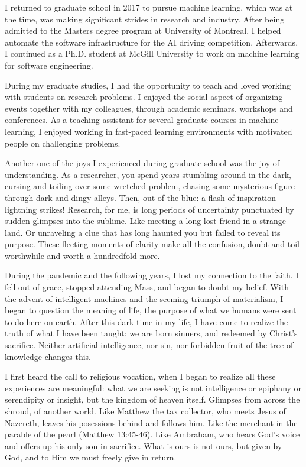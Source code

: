 \documentclass[11pt]{article}
\begin{document}
I returned to graduate school in 2017 to pursue machine learning, which was at the time, was making significant strides in research and industry. After being admitted to the Masters degree program at University of Montreal, I helped automate the software infrastructure for the AI driving competition. Afterwards, I continued as a Ph.D. student at McGill University to work on machine learning for software engineering.

During my graduate studies, I had the opportunity to teach and loved working with students on research problems. I enjoyed the social aspect of organizing events together with my colleagues, through academic seminars, workshops and conferences. As a teaching assistant for several graduate courses in machine learning, I enjoyed working in fast-paced learning environments with motivated people on challenging problems.

Another one of the joys I experienced during graduate school was the joy of understanding. As a researcher, you spend years stumbling around in the dark, cursing and toiling over some wretched problem, chasing some mysterious figure through dark and dingy alleys. Then, out of the blue: a flash of inspiration - lightning strikes! Research, for me, is long periods of uncertainty punctuated by sudden glimpses into the sublime. Like meeting a long lost friend in a strange land. Or unraveling a clue that has long haunted you but failed to reveal its purpose. These fleeting moments of clarity make all the confusion, doubt and toil worthwhile and worth a hundredfold more.

During the pandemic and the following years, I lost my connection to the faith. I fell out of grace, stopped attending Mass, and began to doubt my belief. With the advent of intelligent machines and the seeming triumph of materialism, I began to question the meaning of life, the purpose of what we humans were sent to do here on earth. After this dark time in my life, I have come to realize the truth of what I have been taught: we are born sinners, and redeemed by Christ's sacrifice. Neither artificial intelligence, nor sin, nor forbidden fruit of the tree of knowledge changes this.

I first heard the call to religious vocation, when I began to realize all these experiences are meaningful: what we are seeking is not intelligence or epiphany or serendipity or insight, but the kingdom of heaven itself. Glimpses from across the shroud, of another world. Like Matthew the tax collector, who meets Jesus of Nazereth, leaves his posessions behind and follows him. Like the merchant in the parable of the pearl (Matthew 13:45-46). Like Ambraham, who hears God's voice and offers up his only son in sacrifice. What is ours is not ours, but given by God, and to Him we must freely give in return.
\end{document}
